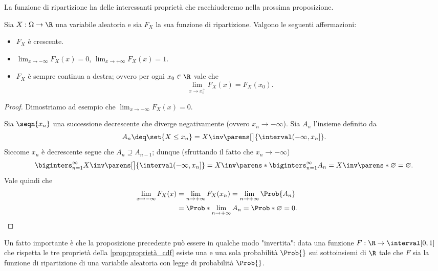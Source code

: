 La funzione di ripartizione ha delle interessanti proprietà che racchiuderemo nella prossima proposizione.
\begin{proposition}
    \label{prop:proprietà_cdf}
    Sia $X : \Omega \to \R$ una variabile aleatoria e sia $F_X$ la sua funzione di ripartizione. Valgono le seguenti affermazioni:
    \begin{itemize}
        \item $F_X$ è crescente.
        \item $\displaystyle\lim_{x \to -\infty} F_X(x) = 0$, $\displaystyle\lim_{x\to +\infty} F_X(x) = 1.$
        \item $F_X$ è sempre continua a destra; ovvero per ogni $x_0 \in \R$ vale che \[
            \lim_{x \to x_0^+} F_X(x) = F_X(x_0).    
        \]
    \end{itemize}
\end{proposition}
\begin{proof}
    Dimostriamo ad esempio che $\displaystyle\lim_{x \to -\infty} F_X(x) = 0$.

    Sia $\seqn{x_n}$ una successione decrescente che diverge negativamente (ovvero $x_n \to -\infty$).
    Sia $A_n$ l'insieme definito da \[
        A_n \deq \set{X \leq x_n} = X\inv\parens[\big]{\interval({-\infty, x_n}]}.
    \] Siccome $x_n$ è decrescente segue che $A_n \supseteq A_{n-1}$; dunque (sfruttando il fatto che $x_n \to -\infty$) \[
        \biginters_{n = 1}^\infty X\inv\parens[\big]{\interval({-\infty, x_n}]}
        =  X\inv\parens*{ \biginters_{n = 1}^\infty A_n }
        = X\inv\parens*{\varnothing}
        = \varnothing.
    \] Vale quindi che \[
        \lim_{x \to -\infty} F_X(x) 
        \begin{alignedat}[t]{1}
            &= \lim_{n \to +\infty} F_X(x_n)
            = \lim_{n \to +\infty} \Prob{A_n}\\
            &= \Prob*{\lim_{n\to +\infty} A_n}
            = \Prob*{\varnothing}
            = 0.    
        \end{alignedat} \tag*{\qedhere}
    \]
\end{proof}

Un fatto importante è che la proposizione precedente può essere in qualche modo "invertita": data una funzione $F : \R \to \interval[{0, 1}]$ che rispetta le tre proprietà della \autoref{prop:proprietà_cdf} esiste una e una sola probabilità $\Prob{}$ sui sottoinsiemi di $\R$ tale che $F$ sia la funzione di ripartizione di una variabile aleatoria con legge di probabilità $\Prob{}$.


